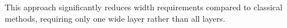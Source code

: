 \documentclass[a4paper]{article}
\theoremstyle{plain}
\theoremstyle{definition}
\theoremstyle{remark}
\begin{document}
This approach significantly reduces width requirements compared to classical methods, requiring only one wide layer rather than all layers.































\newpage
{}
\end{document}
